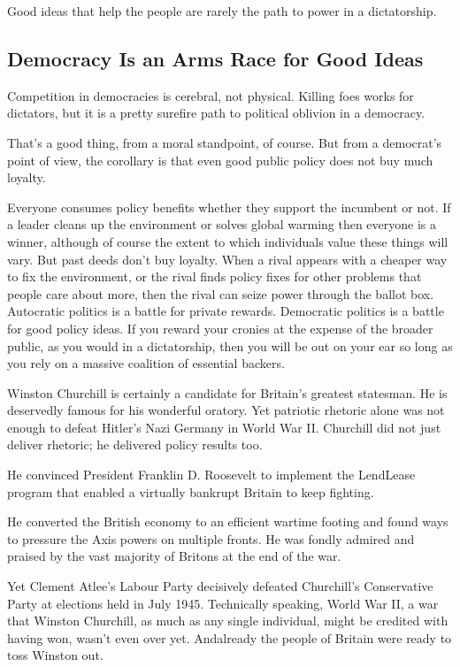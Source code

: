 \documentclass[10pt]{article}
\begin{document}
{\large Good ideas that help the people are rarely the path to power in a
dictatorship.}

\subsection{Democracy Is an Arms Race for Good Ideas}

{\large Competition in democracies is cerebral, not physical. Killing foes works
for dictators, but it is a pretty surefire path to political oblivion in a
democracy.}

{\large That's a good thing, from a moral standpoint, of course. But from a
democrat's point of view, the corollary is that even good public policy does not
buy much loyalty.}

{\large Everyone consumes policy benefits whether they support the incumbent or
not. If a leader cleans up the environment or solves global warming then everyone
is a winner, although of course the extent to which individuals value these
things will vary. But past deeds don't buy loyalty. When a rival appears with a
cheaper way to fix the environment, or the rival finds policy fixes for other
problems that people care about more, then the rival can seize power through the
ballot box. Autocratic politics is a battle for private rewards. Democratic
politics is a battle for good policy ideas. If you reward your cronies at the
expense of the broader public, as you would in a dictatorship, then you will be
out on your ear so long as you rely on a massive coalition of essential backers.}

{\large Winston Churchill is certainly a candidate for Britain's greatest
statesman. He is deservedly famous for his wonderful oratory. Yet patriotic
rhetoric alone was not enough to defeat Hitler's Nazi Germany in World War II.
Churchill did not just deliver rhetoric; he delivered policy results too.}

{\large He convinced President Franklin D. Roosevelt to implement the LendLease
program that enabled a virtually bankrupt Britain to keep fighting.}

{\large He converted the British economy to an efficient wartime footing and
found ways to pressure the Axis powers on multiple fronts. He was fondly admired
and praised by the vast majority of Britons at the end of the war.}

{\large Yet Clement Atlee's Labour Party decisively defeated Churchill's
Conservative Party at elections held in July 1945. Technically speaking, World
War II, a war that Winston Churchill, as much as any single individual, might be
credited with having won, wasn't even over yet. Andalready the people of Britain
were ready to toss Winston out.}
\end{document}
